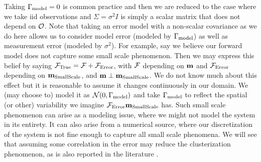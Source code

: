\documentclass{amsart}
\numberwithin{equation}{section}
\begin{document}
Taking $\Gamma_{\textup{model}} = 0$ is common practice
\cite{Tarantola05,KaipioSomersalo05,Vogel02} and then we are reduced
to the case where we take iid observations and $\Sigma = \sigma^2I$ is
simply a scalar matrix that does not depend on $\mathcal{O}$. Note that
taking an error model with a non-scalar covariance as we do here
allows us to consider model error (modeled by $\Gamma_{\textup{model}}$) as well as
measurement error (modeled by $\sigma^2$). For example, say we believe
our forward model does not capture some small scale phenomenon.  Then
we may express this belief by saying $\mathcal{F}_{\textup{True}} = \mathcal{F} + \mathcal{F}_{\textup{Error}}$, with $\mathcal{F}$
depending on $\mathbf{m}$ and $\mathcal{F}_{\textup{Error}}$ depending on $\mathbf{m}_{\textup{SmallScale}}$, and $\mathbf{m}
\perp \mathbf{m}_{\textup{SmallScale}}$. We do not know much about this effect but it is
reasonable to assume it changes continuously in our domain. We (may
choose to) model it as $\mathcal{N} (0, \Gamma_{\textup{model}})$ and take $\Gamma_{\textup{model}}$ to
reflect the spatial (or other) variability we imagine $\mathcal{F}_{\textup{Error}} \mathbf{m}_{\textup{SmallScale}}$
has. Such small scale phenomenon can arise as a modeling issue, where
we might not model the system in its entirety. It can also arise from
a numerical source, where our discretization of the system is not fine
enough to capture all small scale phenomena. We will see that assuming
some correlation in the error may reduce the clusterization
phenomenon, as is also reported in the literature \cite{Ucinski05}.
\end{document}
